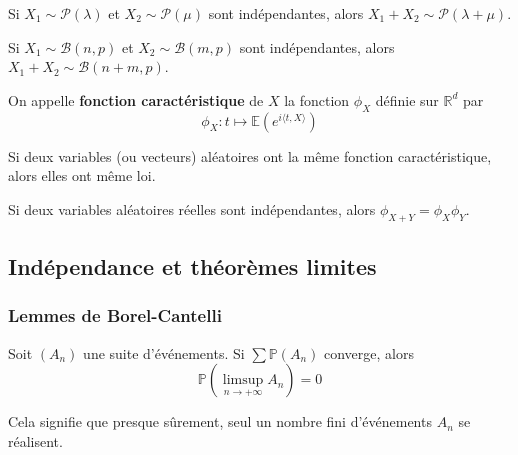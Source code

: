   \begin{example}
    Si $X_1 \sim \mathcal{P}(\lambda)$ et $X_2 \sim \mathcal{P}(\mu)$ sont indépendantes, alors $X_1 + X_2 \sim \mathcal{P}(\lambda + \mu)$.
  \end{example}


  \begin{example}
    Si $X_1 \sim \mathcal{B}(n, p)$ et $X_2 \sim \mathcal{B}(m, p)$ sont indépendantes, alors $X_1 + X_2 \sim \mathcal{B}(n + m, p)$.
  \end{example}


  \begin{definition}
    On appelle \textbf{fonction caractéristique} de $X$ la fonction $\phi_X$ définie sur $\mathbb{R}^d$ par
    \[ \phi_X : t \mapsto \mathbb{E}\left( e^{i \langle t, X \rangle} \right) \]
  \end{definition}

  \begin{theorem}
    Si deux variables (ou vecteurs) aléatoires ont la même fonction caractéristique, alors elles ont même loi.
  \end{theorem}

  \begin{proposition}
    Si deux variables aléatoires réelles sont indépendantes, alors $\phi_{X+Y} = \phi_X \phi_Y$.
  \end{proposition}

  \subsection{Indépendance et théorèmes limites}

  \subsubsection{Lemmes de Borel-Cantelli}


  \begin{theorem}
    Soit $(A_n)$ une suite d'événements. Si $\sum \mathbb{P}(A_n)$ converge, alors
    \[ \mathbb{P} \left( \limsup_{n \rightarrow +\infty} A_n \right) = 0 \]
  \end{theorem}

  \begin{remark}
    Cela signifie que presque sûrement, seul un nombre fini d'événements $A_n$ se réalisent.
  \end{remark}

